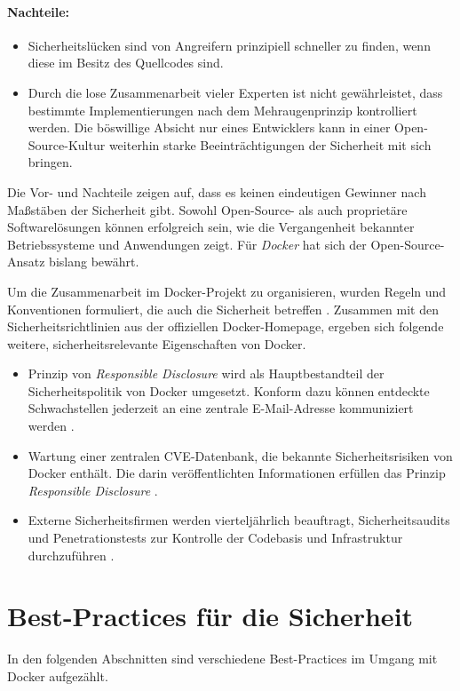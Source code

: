 \documentclass[../main.tex]{subfiles}
\begin{document}
    \paragraph{Nachteile:}
    \begin{itemize}
      \item Sicherheitslücken sind von Angreifern prinzipiell schneller zu finden, wenn diese im Besitz des Quellcodes sind.
      \item Durch die lose Zusammenarbeit vieler Experten ist nicht gewährleistet, dass bestimmte Implementierungen nach dem Mehraugenprinzip kontrolliert werden. Die böswillige Absicht nur eines Entwicklers kann in einer Open-Source-Kultur weiterhin starke Beeinträchtigungen der Sicherheit mit sich bringen.
    \end{itemize}

    Die Vor- und Nachteile zeigen auf, dass es keinen eindeutigen Gewinner nach Maßstäben der Sicherheit gibt. Sowohl Open-Source- als auch proprietäre Softwarelösungen können erfolgreich sein, wie die Vergangenheit bekannter Betriebssysteme und Anwendungen zeigt. Für \emph{Docker} hat sich der Open-Source-Ansatz bislang bewährt.

    Um die Zusammenarbeit im Docker-Projekt zu organisieren, wurden Regeln und Konventionen formuliert, die auch die Sicherheit betreffen \cite{githubDockerContribution}. Zusammen mit den Sicherheitsrichtlinien aus der offiziellen Docker-Homepage, ergeben sich folgende weitere, sicherheitsrelevante Eigenschaften von Docker.

    \begin{itemize}
      \item Prinzip von \emph{Responsible Disclosure} wird als Hauptbestandteil der Sicherheitspolitik von Docker umgesetzt. Konform dazu können entdeckte Schwachstellen jederzeit an eine zentrale E-Mail-Adresse kommuniziert werden \cite{dockerSecurityPortal}.
      \item Wartung einer zentralen \acrshort{CVE}-Datenbank, die bekannte Sicherheitsrisiken von Docker enthält. Die darin veröffentlichten Informationen erfüllen das Prinzip \emph{Responsible Disclosure} \cite{dockerCVEList}.
      \item Externe Sicherheitsfirmen werden vierteljährlich beauftragt, Sicherheitsaudits und Penetrationstests zur Kontrolle der Codebasis und Infrastruktur durchzuführen \cite[S.5]{dockerSecIntro}.
    \end{itemize}

  \section{Best-Practices für die Sicherheit}
    In den folgenden Abschnitten sind verschiedene Best-Practices im Umgang mit Docker aufgezählt.
\end{document}
